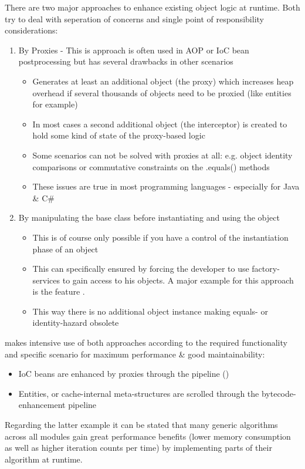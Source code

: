There are two major approaches to enhance existing object logic at runtime. Both try to deal with seperation of concerns and single point of responsibility considerations:
\begin{enumerate}
	\item By Proxies - This is approach is often used in AOP or IoC bean postprocessing but has several drawbacks in other scenarios
		\begin{itemize}
			\item Generates at least an additional object (the proxy) which increases heap overhead if several thousands of objects need to be proxied (like entities for example)
			\item In most cases a second additional object (the interceptor) is created to hold some kind of state of the proxy-based logic
			\item Some scenarios can not be solved with proxies at all: e.g. object identity comparisons or commutative constraints on the .equals() methods\cite{com14}
			\item These issues are true in most programming languages - especially for Java \& C\#
		\end{itemize}
	\item By manipulating the base class before instantiating and using the object
		\begin{itemize}
			\item This is of course only possible if you have a control of the instantiation phase of an object
			\item This can specifically ensured by forcing the developer to use factory-services to gain access to his objects. A major example for this approach is the feature .
			\item This way there is no additional object instance making equals- or identity-hazard obsolete
		\end{itemize}
\end{enumerate}

\AMBETH{} makes intensive use of both approaches according to the required functionality and specific scenario for maximum performance \& good maintainability:
\begin{itemize}
	\item IoC beans are enhanced by proxies through the  pipeline ()
	\item Entities,  or cache-internal meta-structures are scrolled through the bytecode-enhancement pipeline
\end{itemize}
Regarding the latter example it can be stated that many generic algorithms across all modules gain great performance benefits (lower memory consumption as well as higher iteration counts per time) by implementing parts of their algorithm at runtime.

